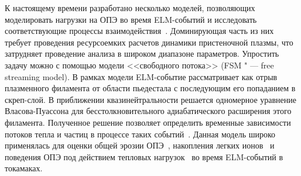 
К настоящему времени разработано несколько моделей, позволяющих моделировать нагрузки на ОПЭ во время ELM-событий и исследовать соответствующие процессы взаимодействия~\cite{Krieger2025,Leonard2014,zohm1996edge}. Доминирующая часть из них требует проведения ресурсоемких расчетов динамики пристеночной плазмы, что затрудняет проведение анализа в широком диапазоне параметров. Упростить задачу можно с помощью модели <<свободного потока>> (FSM " --- free streaming model). В рамках модели ELM-событие рассматривает как отрыв плазменного филамента от области пьедестала с последующим его попаданием в скреп-слой. В приближении квазинейтральности решается одномерное уравнение Власова-Пуассона для бесстолкновительного адиабатического расширения этого филамента. Полученное решение позволяет определить временные зависимости потоков тепла и частиц в процессе таких событий~\cite{Fundamenski2006, Moulton2013}. Данная модель широко применялась для оценки общей эрозии ОПЭ~\cite{Abrams2018, Wang2024}, накопления легких ионов~\cite{Dasgupta2023} и поведения ОПЭ под действием тепловых нагрузок~\cite{VandenKerkhof2021} во время ELM-событий в токамаках.


